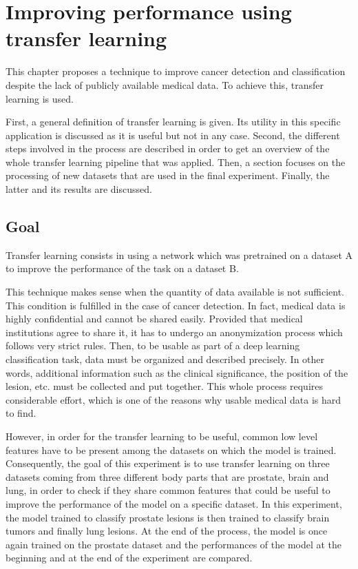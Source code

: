 
\chapter{Improving performance using transfer learning}
\label{ch:transfer_learning}
\setlength{\marginparwidth}{3cm}\leavevmode {}This chapter proposes a technique to improve cancer detection and classification despite the lack of publicly available medical data. To achieve this, transfer learning is used.

First, a general definition of transfer learning is given. Its utility in this specific application is discussed as it is useful but not in any case. Second, the different steps involved in the process are described in order to get an overview of the whole transfer learning pipeline that was applied. Then, a section focuses on the processing of new datasets that are used in the final experiment. Finally, the latter and its results are discussed. 


\section{Goal}
\setlength{\marginparwidth}{3cm}\leavevmode {}Transfer learning consists in using a network which was pretrained on a dataset A to improve the performance of the task on a dataset B.

This technique makes sense when the quantity of data available is not sufficient. This condition is fulfilled in the case of cancer detection. In fact, medical data is highly confidential and cannot be shared easily. Provided that medical institutions agree to share it, it has to undergo an anonymization process which follows very strict rules. Then, to be usable as part of a deep learning classification task, data must be organized and described precisely. In other words, additional information such as the clinical significance, the position of the lesion, etc. must be collected and put together. This whole process requires considerable effort, which is one of the reasons why usable medical data is hard to find.

However, in order for the transfer learning to be useful, common low level features have to be present among the datasets on which the model is trained. Consequently, the goal of this experiment is to use transfer learning on three datasets coming from three different body parts that are prostate, brain and lung, in order to check if they share common features that could be useful to improve the performance of the model on a specific dataset. In this experiment, the model trained to classify prostate lesions is then trained to classify brain tumors and finally lung lesions. At the end of the process, the model is once again trained on the prostate dataset and the performances of the model at the beginning and at the end of the experiment are compared.


